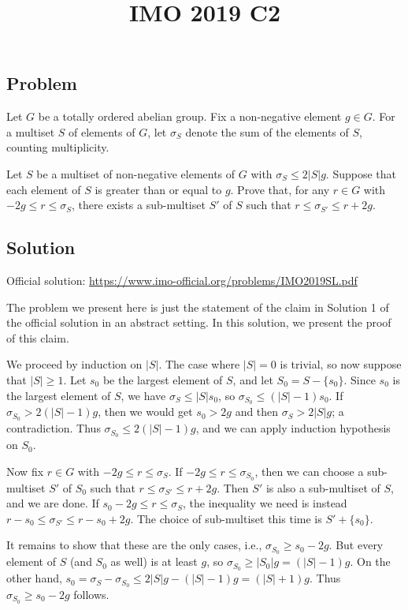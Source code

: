 \documentclass{article}
\title{IMO 2019 C2}
\author{}
\date{}
\begin{document}
\maketitle



\subsection*{Problem}

Let $G$ be a totally ordered abelian group.
Fix a non-negative element $g \in G$.
For a multiset $S$ of elements of $G$, let $\sigma_S$ denote the sum of the elements of $S$, counting multiplicity.

Let $S$ be a multiset of non-negative elements of $G$ with $\sigma_S \leq 2|S| g$.
Suppose that each element of $S$ is greater than or equal to $g$.
Prove that, for any $r \in G$ with $-2g \leq r \leq \sigma_S$, there exists a sub-multiset $S'$ of $S$ such that $r \leq \sigma_{S'} \leq r + 2g$.



\subsection*{Solution}

Official solution: \url{https://www.imo-official.org/problems/IMO2019SL.pdf}

The problem we present here is just the statement of the claim in Solution 1 of the official solution in an abstract setting.
In this solution, we present the proof of this claim.

We proceed by induction on $|S|$.
The case where $|S| = 0$ is trivial, so now suppose that $|S| \geq 1$.
Let $s_0$ be the largest element of $S$, and let $S_0 = S - \{s_0\}$.
Since $s_0$ is the largest element of $S$, we have $\sigma_S \leq |S| s_0$, so $\sigma_{S_0} \leq (|S| - 1) s_0$.
If $\sigma_{S_0} > 2(|S| - 1) g$, then we would get $s_0 > 2g$ and then $\sigma_S > 2|S| g$; a contradiction.
Thus $\sigma_{S_0} \leq 2(|S| - 1) g$, and we can apply induction hypothesis on $S_0$.

Now fix $r \in G$ with $-2g \leq r \leq \sigma_S$.
If $-2g \leq r \leq \sigma_{S_0}$, then we can choose a sub-multiset $S'$ of $S_0$ such that $r \leq \sigma_{S'} \leq r + 2g$.
Then $S'$ is also a sub-multiset of $S$, and we are done.
If $s_0 - 2g \leq r \leq \sigma_S$, the inequality we need is instead $r - s_0 \leq \sigma_{S'} \leq r - s_0 + 2g$.
The choice of sub-multiset this time is $S' + \{s_0\}$.

It remains to show that these are the only cases, i.e., $\sigma_{S_0} \geq s_0 - 2g$.
But every element of $S$ (and $S_0$ as well) is at least $g$, so $\sigma_{S_0} \geq |S_0| g = (|S| - 1) g$.
On the other hand, $s_0 = \sigma_S - \sigma_{S_0} \leq 2|S| g - (|S| - 1) g = (|S| + 1) g$.
Thus $\sigma_{S_0} \geq s_0 - 2g$ follows.
 
\end{document}
